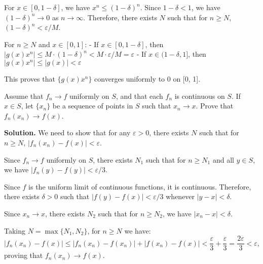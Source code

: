 For \( x \in [0, 1 - \delta] \), we have \( x^n \leq (1 - \delta)^n \). Since \( 1 - \delta < 1 \), we have \( (1 - \delta)^n \to 0 \) as \( n \to \infty \). Therefore, there exists \( N \) such that for \( n \geq N \), \( (1 - \delta)^n < \varepsilon/M \).

For \( n \geq N \) and \( x \in [0, 1] \):
- If \( x \in [0, 1 - \delta] \), then \( |g(x)x^n| \leq M \cdot (1 - \delta)^n < M \cdot \varepsilon/M = \varepsilon \)
- If \( x \in (1 - \delta, 1] \), then \( |g(x)x^n| \leq |g(x)| < \varepsilon \)

This proves that \( \{g(x)x^n\} \) converges uniformly to 0 on [0, 1].

\begin{problembox}
Assume that \( f_n \to f \) uniformly on \( S \), and that each \( f_n \) is continuous on \( S \). If \( x \in S \), let \( \{x_n\} \) be a sequence of points in \( S \) such that \( x_n \to x \). Prove that \( f_n(x_n) \to f(x) \).
\end{problembox}

\noindent\textbf{Solution.} We need to show that for any \( \varepsilon > 0 \), there exists \( N \) such that for \( n \geq N \), \( |f_n(x_n) - f(x)| < \varepsilon \).

Since \( f_n \to f \) uniformly on \( S \), there exists \( N_1 \) such that for \( n \geq N_1 \) and all \( y \in S \), we have \( |f_n(y) - f(y)| < \varepsilon/3 \).

Since \( f \) is the uniform limit of continuous functions, it is continuous. Therefore, there exists \( \delta > 0 \) such that \( |f(y) - f(x)| < \varepsilon/3 \) whenever \( |y - x| < \delta \).

Since \( x_n \to x \), there exists \( N_2 \) such that for \( n \geq N_2 \), we have \( |x_n - x| < \delta \).

Taking \( N = \max\{N_1, N_2\} \), for \( n \geq N \) we have:
\[|f_n(x_n) - f(x)| \leq |f_n(x_n) - f(x_n)| + |f(x_n) - f(x)| < \frac{\varepsilon}{3} + \frac{\varepsilon}{3} = \frac{2\varepsilon}{3} < \varepsilon,\]
proving that \( f_n(x_n) \to f(x) \).

